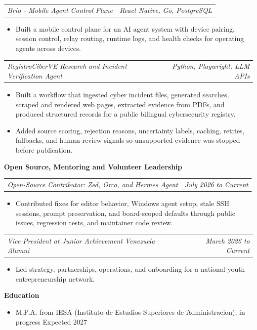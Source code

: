 \documentclass[10pt,letterpaper]{article}
\makeatletter
\newcommand{\bodyfont}{\fontsize{10.5}{15.75}\selectfont}
\newcommand{\sectiontitle}[1]{%
  \vspace{4pt}
  {\bodyfont\textbf{#1}}\par
  \nopagebreak[4]
  \vspace{2pt}
}
\newcommand{\roleline}[2]{%
  \begin{tabularx}{\textwidth}{@{}Xr@{}}
    \bodyfont\textit{#1} & \bodyfont\textit{#2}
  \end{tabularx}
  \nopagebreak[4]
  \vspace{1pt}
}
\makeatother
\begin{document}
\vspace{3pt}
\roleline{Brio - Mobile Agent Control Plane}{React Native, Go, PostgreSQL}
\begin{itemize}
  \item Built a mobile control plane for an AI agent system with device pairing, session control, relay routing, runtime logs, and health checks for operating agents across devices.
\end{itemize}

\vspace{3pt}
\roleline{RegistroCiberVE Research and Incident Verification Agent}{Python, Playwright, LLM APIs}
\begin{itemize}
  \item Built a workflow that ingested cyber incident files, generated searches, scraped and rendered web pages, extracted evidence from PDFs, and produced structured records for a public bilingual cybersecurity registry.
  \item Added source scoring, rejection reasons, uncertainty labels, caching, retries, fallbacks, and human-review signals so unsupported evidence was stopped before publication.
\end{itemize}

\sectiontitle{Open Source, Mentoring and Volunteer Leadership}

\roleline{Open-Source Contributor: Zed, Orca, and Hermes Agent}{July 2026 to Current}
\begin{itemize}
  \item Contributed fixes for editor behavior, Windows agent setup, stale SSH sessions, prompt preservation, and board-scoped defaults through public issues, regression tests, and maintainer code review.
\end{itemize}

\vspace{3pt}
\roleline{Vice President at Junior Achievement Venezuela Alumni}{March 2026 to Current}
\begin{itemize}
  \item Led strategy, partnerships, operations, and onboarding for a national youth entrepreneurship network.
\end{itemize}

\sectiontitle{Education}
\begin{itemize}
  \item M.P.A. from IESA (Instituto de Estudios Superiores de Administracion), in progress \hfill Expected 2027
\end{itemize}
\end{document}
